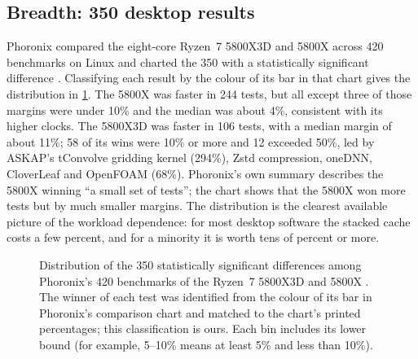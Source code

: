 \subsection{Breadth: 350 desktop results}
\label{sec:phoronix}
Phoronix compared the eight-core Ryzen~7 5800X3D and 5800X across 420 benchmarks on Linux and charted the 350 with a statistically significant difference \cite{larabelAMDRyzen72022}. Classifying each result by the colour of its bar in that chart gives the distribution in \cref{fig:phoronix-hist}. The 5800X was faster in 244 tests, but all except three of those margins were under 10\% and the median was about 4\%, consistent with its higher clocks. The 5800X3D was faster in 106 tests, with a median margin of about 11\%; 58 of its wins were 10\% or more and 12 exceeded 50\%, led by ASKAP's tConvolve gridding kernel (294\%), Zstd compression, oneDNN, CloverLeaf and OpenFOAM (68\%). Phoronix's own summary describes the 5800X winning ``a small set of tests''; the chart shows that the 5800X won more tests but by much smaller margins. The distribution is the clearest available picture of the workload dependence: for most desktop software the stacked cache costs a few percent, and for a minority it is worth tens of percent or more.

\begin{figure}[htbp]
\centering
{}
\caption[Distribution of Phoronix's 350 significant differences, 5800X3D against 5800X]{Distribution of the 350 statistically significant differences among Phoronix's 420 benchmarks of the Ryzen~7 5800X3D and 5800X \cite{larabelAMDRyzen72022}. The winner of each test was identified from the colour of its bar in Phoronix's comparison chart and matched to the chart's printed percentages; this classification is ours. Each bin includes its lower bound (for example, 5--10\% means at least 5\% and less than 10\%).}
\label{fig:phoronix-hist}
\end{figure}

